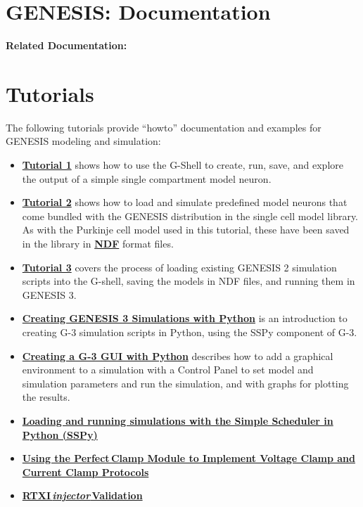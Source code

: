 \documentclass[12pt]{article}
\begin{document}
\section*{GENESIS: Documentation}

{\bf Related Documentation:}

\section*{Tutorials}

The following tutorials provide ``howto'' documentation and examples for
GENESIS modeling and simulation:

\begin{itemize}

   \item[]\href{../tutorial1/tutorial1.html}
          {\bf Tutorial 1} shows how to use the G-Shell to create, run,
          save, and explore the output of a simple single compartment model neuron.

   \item[]\href{../tutorial2/tutorial2.html}
          {\bf Tutorial 2} shows how to load and simulate predefined model
    neurons that come bundled with the GENESIS distribution in the single
    cell model library. As with the Purkinje cell model used in this
    tutorial, these have been saved in the library in
    \href{../ndf-file-format/ndf-file-format.tex}{\bf NDF} format files.

   \item[]\href{../tutorial3/tutorial3.html}
          {\bf Tutorial 3} covers the process of loading existing GENESIS 2
   simulation scripts into the G-shell, saving the models in NDF files, and
   running them in GENESIS 3. 

   \item[]\href{../tutorial-python-scripting/tutorial-python-scripting.html}
          {\bf Creating GENESIS 3 Simulations with Python}
    is an introduction to creating G-3 simulation
    scripts in Python, using the SSPy component of G-3.

   \item[]\href{../tutorial-python-gui/tutorial-python-gui.html}
          {\bf Creating a G-3 GUI with Python}
    describes how to add a graphical environment to a simulation with a Control Panel to
    set model and simulation parameters and run the simulation, and with graphs for plotting
    the  results.

   \item[]\href{../sspy/sspy.tex}{\bf Loading and running simulations with the
 Simple Scheduler in Python (SSPy)}

   \item[]\href{../pclamp/pclamp.tex}{\bf Using the Perfect\,Clamp Module to Implement Voltage Clamp and Current Clamp Protocols}
   \item[]\href{../rtxi-injector-validation/rtxi-injector-validation.tex}{\bf RTXI\,{\it injector}\,Validation}
\end{itemize}
\end{document}
